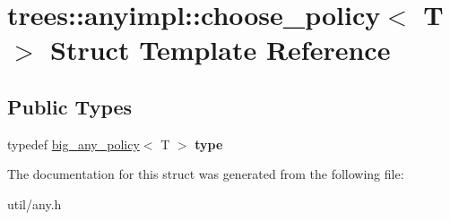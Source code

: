 \hypertarget{structtrees_1_1anyimpl_1_1choose__policy}{}\section{trees\+:\+:anyimpl\+:\+:choose\+\_\+policy$<$ T $>$ Struct Template Reference}
\label{structtrees_1_1anyimpl_1_1choose__policy}
\subsection*{Public Types}
\begin{DoxyCompactItemize}
\item 
\mbox{\label{structtrees_1_1anyimpl_1_1choose__policy_a0793f64590b26da57acc9f662cdfb2d0}} 
typedef \hyperlink{structtrees_1_1anyimpl_1_1big__any__policy}{big\+\_\+any\+\_\+policy}$<$ T $>$ {\bfseries type}
\end{DoxyCompactItemize}


The documentation for this struct was generated from the following file\+:\begin{DoxyCompactItemize}
\item 
util/any.\+h\end{DoxyCompactItemize}
